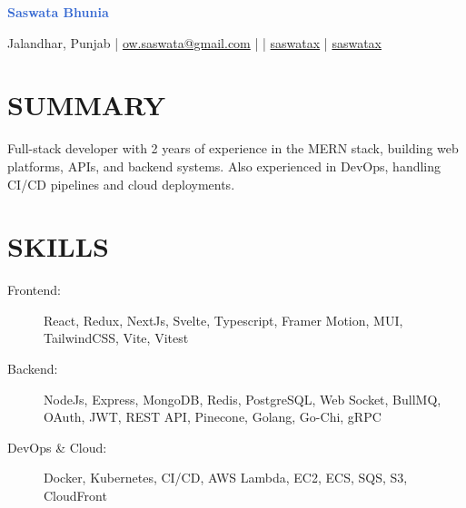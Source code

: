 \documentclass[]{resume}
\begin{document}
\textrm{\Huge\textcolor{highlight}{\textbf{Saswata Bhunia}}}
\vspace{.4em}

Jalandhar, Punjab | \href{mailto:ow.saswata@gmail.com}{\faEnvelope \space ow.saswata@gmail.com} | \faPhone {} | \href{https://www.linkedin.com/in/saswatax}{\faLinkedin \space saswatax} | \href{https://github.com/saswatax}{\faGithub \space saswatax}
\vspace{.4em}

\section{SUMMARY}
Full-stack developer with 2 years of experience in the MERN stack, building web platforms, APIs, and backend systems. Also experienced in DevOps, handling CI/CD pipelines and cloud deployments.

\section{SKILLS}
\begin{description}
  \item[Frontend:] React, Redux, NextJs, Svelte, Typescript, Framer Motion, MUI, TailwindCSS, Vite, Vitest
  \item[Backend:] NodeJs, Express, MongoDB, Redis, PostgreSQL, Web Socket, BullMQ, OAuth, JWT, REST API, Pinecone, Golang, Go-Chi, gRPC
  \item[DevOps \& Cloud:] Docker, Kubernetes, CI/CD, AWS Lambda, EC2, ECS, SQS, S3, CloudFront
\end{description}
\end{document}
